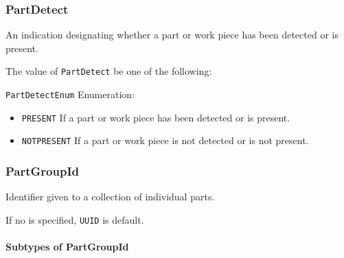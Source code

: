 \subsubsection{PartDetect}
\label{sec:PartDetect}



An indication designating whether a part or work piece has been detected or is present.



The value of \texttt{PartDetect} \MUST be one of the following: 


\texttt{PartDetectEnum} Enumeration:

\begin{itemize}
\item \texttt{PRESENT} \newline If a part or work piece has been detected or is present. 
\item \texttt{NOT\textunderscore PRESENT} \newline If a part or work piece is not detected or is not present. 
\end{itemize}



\subsubsection{PartGroupId}
\label{sec:PartGroupId}



Identifier given to a collection of individual parts. 

If no  is specified, \texttt{UUID} is default.


\paragraph{Subtypes of PartGroupId}\mbox{}
\label{sec:Subtypes of PartGroupId}

